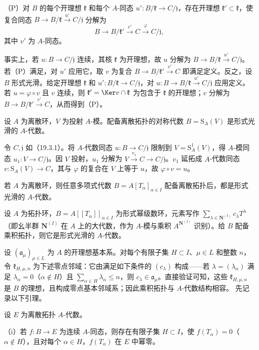 \noindent（P）对 $B$ 的每个开理想 $\mathfrak k$ 和每个 $A$-同态 $u':B/\mathfrak k\to C/\mathfrak j$，存在开理想 $\mathfrak k'\subset\mathfrak k$，使复合同态 $B\to B/\mathfrak k\xrightarrow{u'}C/\mathfrak j$ 分解为
\[
 B\to B/\mathfrak k'\xrightarrow{v'}C\xrightarrow{\varphi}C/\mathfrak j,
\]
其中 $v'$ 为 $A$-同态。

事实上，若 $u:B\to C/\mathfrak j$ 连续，其核 $\mathfrak k$ 为开理想，故 $u$ 分解为 $B\to B/\mathfrak k\xrightarrow{u'}C/\mathfrak j$。若（P）满足，对 $u'$ 应用它，取 $v$ 为复合 $B\to B/\mathfrak k'\xrightarrow{v'}C$ 即满足定义。反之，设 $B$ 形式光滑。给定开理想 $\mathfrak k$ 和 $u':B/\mathfrak k\to C/\mathfrak j$，对 $u:B\to B/\mathfrak k\xrightarrow{u'}C/\mathfrak j$ 应用定义。若 $u=\varphi\circ v$ 且 $v$ 连续，则 $\mathfrak k'=\Ker v\cap\mathfrak k$ 为包含于 $\mathfrak k$ 的开理想；$v$ 分解为 $B\to B/\mathfrak k'\xrightarrow{v'}C$，从而得到（P）。

设 $A$ 为离散环，$V$ 为投射 $A$-模。配备离散拓扑的对称代数 $B=\mathrm S_A(V)$ 是形式光滑的 $A$-代数。

令 $C,\mathfrak j$ 如（19.3.1）。将 $A$-代数同态 $u:B\to C/\mathfrak j$ 限制到 $V=\mathrm S_A^1(V)$，得 $A$-模同态 $u_1:V\to C/\mathfrak j$。因 $V$ 投射，$u_1$ 分解为 $V\xrightarrow{v_1}C\to C/\mathfrak j$。$v_1$ 延拓成 $A$-代数同态 $v:\mathrm S_A(V)\to C$，其与 $\varphi$ 的复合在 $V$ 上等于 $u$，故 $\varphi\circ v=u$。

若 $A$ 为离散环，则任意多项式代数 $B=A[T_\alpha]_{\alpha\in I}$ 配备离散拓扑后，都是形式光滑的 $A$-代数。

设 $A$ 为拓扑环，$B=A[[T_\alpha]]_{\alpha\in I}$ 为形式幂级数环，元素写作 $\sum_{\lambda\in\mathbf N^{(I)}}c_\lambda T^\lambda$（即幺半群 $\mathbf N^{(I)}$ 在 $A$ 上的大代数，作为 $A$-模与乘积 $A^{\mathbf N^{(I)}}$ 识别）。给 $B$ 配备乘积拓扑，则它是形式光滑的 $A$-代数。

设 $(\mathfrak a_\mu)_{\mu\in L}$ 为 $A$ 的开理想基本系。对每个有限子集 $H\subset I$、$\mu\in L$ 和整数 $n$，令 $\mathfrak k_{H,\mu,n}$ 为下述零点邻域：它由满足如下条件的 $(c_\lambda)$ 构成——若 $\lambda=(\lambda_\alpha)$ 满足 $\lambda_\alpha=0$（$\alpha\notin H$）且 $\sum_{\alpha\in H}\lambda_\alpha\leq n$，则 $c_\lambda\in\mathfrak a_\mu$。直接验证可知，这些 $\mathfrak k_{H,\mu,n}$ 是 $B$ 的理想，且构成零点基本邻域系；因此乘积拓扑与 $A$-代数结构相容。
先记录以下引理。

设 $E$ 为离散拓扑 $A$-代数。

（i）若 $f:B\to E$ 为连续 $A$-同态，则存在有限子集 $H\subset I$，使 $f(T_\alpha)=0$（$\alpha\notin H$），且对每个 $\alpha\in H$，$f(T_\alpha)$ 在 $E$ 中幂零。

